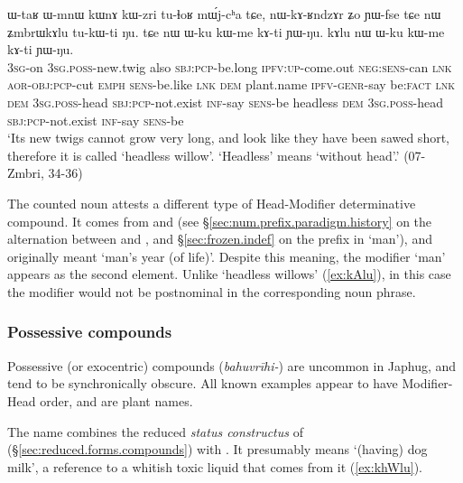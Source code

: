 \begin{exe}
\ex \label{ex:kAlu}  
\gll ɯ-taʁ ɯ-mnɯ kɯnɤ kɯ-zri tu-ɬoʁ mɯ́j-cʰa tɕe, nɯ-kɤ-ʁndzɤr ʑo ɲɯ-fse tɕe nɯ ʑmbrɯkɤlu tu-kɯ-ti ŋu. tɕe nɯ ɯ-ku kɯ-me kɤ-ti ɲɯ-ŋu.  kɤlu nɯ ɯ-ku kɯ-me kɤ-ti ɲɯ-ŋu.\\
\textsc{3sg}-on \textsc{3sg}.\textsc{poss}-new.twig also \textsc{sbj}:\textsc{pcp}-be.long \textsc{ipfv}:\textsc{up}-come.out \textsc{neg}:\textsc{sens}-can \textsc{lnk} \textsc{aor}-\textsc{obj}:\textsc{pcp}-cut \textsc{emph} \textsc{sens}-be.like \textsc{lnk} \textsc{dem} plant.name \textsc{ipfv}-\textsc{genr}-say be:\textsc{fact} \textsc{lnk}  \textsc{dem} \textsc{3sg}.\textsc{poss}-head \textsc{sbj}:\textsc{pcp}-not.exist \textsc{inf}-say \textsc{sens}-be headless \textsc{dem} \textsc{3sg}.\textsc{poss}-head \textsc{sbj}:\textsc{pcp}-not.exist \textsc{inf}-say \textsc{sens}-be\\
\glt `Its new twigs cannot grow very long, and look like they have been sawed short, therefore it is called `headless willow'. `Headless' means `without head'.' (07-Zmbri, 34-36)
\end{exe}

The counted noun  attests a different type of Head-Modifier determinative compound. It comes from  and  (see §\ref{sec:num.prefix.paradigm.history} on the alternation between  and , and §\ref{sec:frozen.indef} on the  prefix in `man'), and originally meant `man's year (of life)'. Despite this meaning, the modifier  `man' appears as the second element. Unlike `headless willows' (\ref{ex:kAlu}), in this case the modifier would not be postnominal in the corresponding noun phrase. 


\subsubsection{Possessive compounds} \label{sec:possessive.n.n}
Possessive (or exocentric) compounds (\textit{bahuvrīhi-}) are uncommon in Japhug, and tend to be synchronically obscure. All known examples appear to have Modifier-Head order, and are plant names.

The name \textit{} combines the reduced \textit{status constructus} of  (§\ref{sec:reduced.forms.compounds}) with . It presumably means `(having) dog milk', a reference to a whitish toxic liquid that comes from it (\ref{ex:khWlu}).


